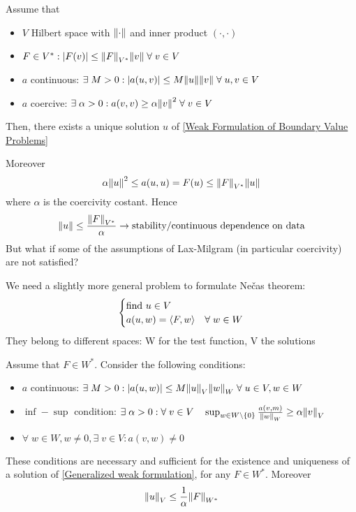 \begin{theorem}
    Assume that 
    \begin{itemize}
        \item \(V\) Hilbert space with \(\norm{\cdot}\) and inner product \((\cdot, \cdot)\)
        \item \(F \in V^*: \abs{F(v)} \leq \norm{F}_{V^*}\norm{v} \; \forall \; v \in V\)
        \item \(a\) continuous: \(\exists \; M > 0: \abs{a(u,v)} \leq M \norm{u}\norm{v} \; \forall \; u,v \in V\)
        \item \(a\) coercive: \(\exists \; \alpha > 0: a(v,v) \geq \alpha\norm{v}^2 \; \forall \; v \in V\)
    \end{itemize}
    Then, there exists a unique solution \(u\) of \ref*{Weak Formulation of Boundary Value Problems}
\end{theorem}
Moreover 
\[
    \alpha \norm{u}^2 \leq a(u,u) = F(u) \leq \norm{F}_{V^*} \norm{u}
\]
where \(\alpha\) is the coercivity costant. Hence
\[
    \norm{u} \leq \frac{\norm{F}_{V^*}}{\alpha} \to \text{stability/continuous dependence on data}
\]
But what if some of the assumptions of Lax-Milgram (in particular coercivity) are not satisfied?

We need a slightly more general problem to formulate Nečas theorem:
\begin{equation}
    \begin{cases}
        \text{find } u \in V \\
        a(u,w) = \langle F,w \rangle & \forall \; w \in W \label{Generalized weak formulation}
    \end{cases}
\end{equation}
They belong to different spaces: W for the test function, V the solutions
\begin{theorem}[Nečas]
    Assume that \(F \in W^*\). Consider the following conditions:
    \begin{itemize}
        \item \(a\) continuous: \(\exists \; M > 0: \abs{a(u,w)} \leq M \norm{u}_V \norm{w}_W \; \forall \; u \in V, w \in W\)
        \item \(\inf-\sup\) condition: \(\exists \; \alpha > 0: \forall \; v \in V \quad \sup_{w \in W \setminus \left\{0\right\}} \frac{a(v,m)}{\norm{w}_W} \geq \alpha \norm{v}_V\)
        \item \(\forall \; w \in W, w \neq 0, \exists \; v \in V : a(v,w) \neq 0\)
    \end{itemize}
    These conditions are necessary and sufficient for the existence and uniqueness of a solution of \ref*{Generalized weak formulation}, for any \(F \in W^*\). Moreover 
    \[
        \norm{u}_V \leq \frac{1}{\alpha}\norm{F}_{W^*}
    \]
\label{Nečas}
\end{theorem}

